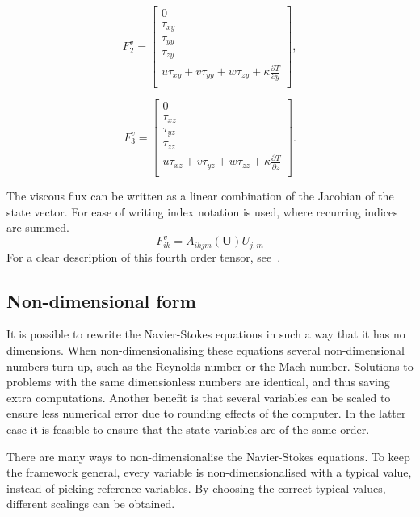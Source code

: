 \documentclass{report}
\newcommand{\dy}[1]{\frac{\partial #1}{\partial y}}
\newcommand{\dz}[1]{\frac{\partial #1}{\partial z}}
\begin{document}
\begin{equation*}
{F}_{2}^v =
\left[
\begin{array}{c}
0		\\
\tau_{xy}	 	\\
\tau_{yy}		\\
\tau_{zy}		\\
u\tau_{xy} + v\tau_{yy} + w\tau_{zy} + \kappa\dy{T}	\\
\end{array}
\right],
\end{equation*}

\begin{equation*}
{F}_{3}^v =
\left[
\begin{array}{c}
0		\\
\tau_{xz}	 	\\
\tau_{yz}		\\
\tau_{zz}		\\
u\tau_{xz} + v\tau_{yz} + w\tau_{zz} + \kappa\dz{T}	\\
\end{array}
\right].
\end{equation*}

The viscous flux can be written as a linear combination of the Jacobian of the state vector. For ease of writing index notation is used, where recurring indices are summed. 
\begin{equation}
\label{e:Atensor}
F^v_{ik} = A_{ikjm}(\mathbf{U})U_{j,m}
\end{equation}
For a clear description of this fourth order tensor, see~\cite{}.


\subsection{Non-dimensional form}
It is possible to rewrite the Navier-Stokes equations in such a way that it has no dimensions. When non-dimensionalising these equations several non-dimensional numbers turn up, such as the Reynolds number or the Mach number. Solutions to problems with the same dimensionless numbers are identical, and thus saving extra computations. Another benefit is that several variables can be scaled to ensure less numerical error due to rounding effects of the computer. In the latter case it is feasible to ensure that the state variables are of the same order.

There are many ways to non-dimensionalise the Navier-Stokes equations. To keep the framework general, every variable is non-dimensionalised with a typical value, instead of picking reference variables. By choosing the correct typical values, different scalings can be obtained.
\end{document}
